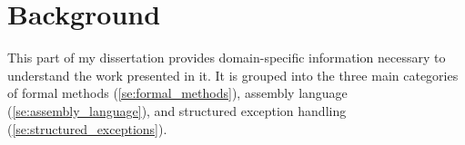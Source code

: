 \chapter{Background}\label{ch:background}
This part of my dissertation provides domain-specific information
necessary to understand the work presented in it.
It is grouped into the three main categories of
formal methods (\cref{se:formal_methods}),
assembly language (\cref{se:assembly_language}),
and structured exception handling (\cref{se:structured_exceptions}).

\begin{comment}

%
%

\end{comment}
